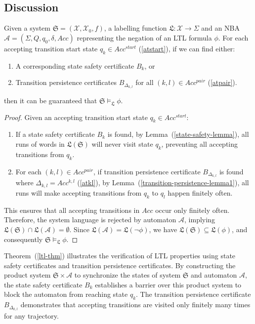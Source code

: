 \subsection{Discussion}
\begin{theorem}
  \label{ltl-thm}
   Given a system $\mathfrak{S} = (\mathcal{X}, \mathcal{X}_0, f)$, a labelling function $\mathfrak{L}: \mathcal{X} \rightarrow \Sigma$ and an NBA $\mathcal{A} = (\Sigma, Q, q_0, \delta, Acc)$ representing the negation of an LTL formula $\phi$. For each accepting transition start state $q_k \in Acc^{start}$ (\ref{atstart}), if we can find either:
  \begin{enumerate}
      \item A corresponding state safety certificate $B_k$, or
      \item Transition persistence certificates $B_{\Delta_{k,l}}$ for all $(k, l) \in Acc^{pair}$ (\ref{atpair}).
  \end{enumerate}
  then it can be guaranteed that $\mathfrak{S} \models_{\mathfrak{L}} \phi$.
\end{theorem}
\begin{proof}
  Given an accepting transition start state $q_k \in Acc^{start}$:
  \begin{enumerate}
      \item If a state safety certificate $B_k$ is found, by Lemma~(\ref{state-safety-lemma}), all runs of words in $\mathfrak{L}(\mathfrak{S})$ will never visit state $q_k$, preventing all accepting transitions from $q_k$.

      \item For each $(k, l) \in Acc^{pair}$, if transition persistence certificate $B_{\Delta_{k,l}}$ is found where $\Delta_{k,l} = Acc^{k,l}$ (\ref{atkl}), by Lemma~(\ref{transition-persistence-lemma1}), all runs will make accepting transitions from $q_k$ to $q_l$ happen finitely often.
  \end{enumerate}

  This ensures that all accepting transitions in $Acc$ occur only finitely often. Therefore, the system language is rejected by automaton $\mathcal{A}$, implying $\mathfrak{L}(\mathfrak{S}) \cap \mathfrak{L}(\mathcal{A}) = \emptyset$. Since $\mathfrak{L}(\mathcal{A}) = \mathfrak{L}(\neg \phi)$, we have $\mathfrak{L}(\mathfrak{S}) \subseteq \mathfrak{L}(\phi)$, and consequently $\mathfrak{S} \models_{\mathfrak{L}} \phi$.
\end{proof}

Theorem~(\ref{ltl-thm}) illustrates the verification of LTL properties using state safety certificates and transition persistence certificates. By constructing the product system $\mathfrak{S} \times \mathcal{A}$ to synchronize the states of system $\mathfrak{S}$ and automaton $\mathcal{A}$, the state safety certificate $B_k$ establishes a barrier over this product system to block the automaton from reaching state $q_k$. The transition persistence certificate $B_{\Delta_{k,l}}$ demonstrates that accepting transitions are visited only finitely many times for any trajectory.

